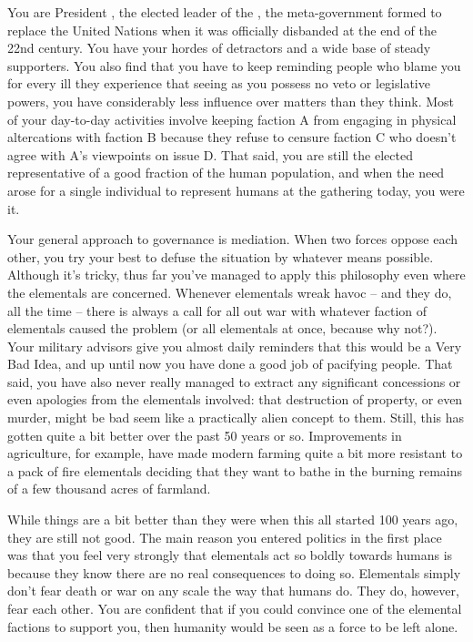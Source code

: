 \documentclass[char]{elementals}
\begin{document}
\name{\cLeader{}}

You are President \cLeader{\intro}, the elected leader of the \cNewUN{\intro}, the meta-government formed to replace the United Nations when it was officially disbanded at the end of the 22nd century. You have your hordes of detractors and a wide base of steady supporters. You also find that you have to keep reminding people who blame you for every ill they experience that seeing as you possess no veto or legislative powers, you have considerably less influence over matters than they think. Most of your day-to-day activities involve keeping faction A from engaging in physical altercations with faction B because they refuse to censure faction C who doesn't agree with A's viewpoints on issue D. That said, you are still the elected representative of a good fraction of the human population, and when the need arose for a single individual to represent humans at the gathering today, you were it.

Your general approach to governance is mediation. When two forces oppose each other, you try your best to defuse the situation by whatever means possible. Although it's tricky, thus far you've managed to apply this philosophy even where the elementals are concerned. Whenever elementals wreak havoc -- and they do, all the time -- there is always a call for all out war with whatever faction of elementals caused the problem (or all elementals at once, because why not?). Your military advisors give you almost daily reminders that this would be a Very Bad Idea, and up until now you have done a good job of pacifying people. That said, you have also never really managed to extract any significant concessions or even apologies from the elementals involved: that destruction of property, or even murder, might be bad seem like a practically alien concept to them. Still, this has gotten quite a bit better over the past 50 years or so. Improvements in agriculture, for example, have made modern farming quite a bit more resistant to a pack of fire elementals deciding that they want to bathe in the burning remains of a few thousand acres of farmland.

While things are a bit better than they were when this all started 100 years ago, they are still not good. The main reason you entered politics in the first place was that you feel very strongly that elementals act so boldly towards humans is because they know there are no real consequences to doing so. Elementals simply don't fear death or war on any scale the way that humans do. They do, however, fear each other. You are confident that if you could convince one of the elemental factions to support you, then humanity would be seen as a force to be left alone.
\end{document}
